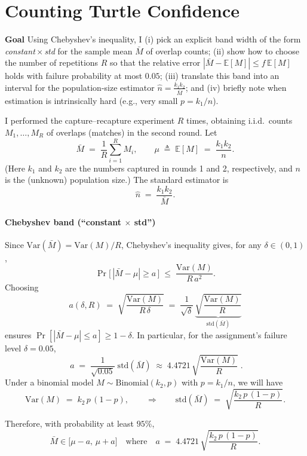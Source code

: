 \section{Counting Turtle Confidence }

\textbf{Goal} Using Chebyshev's inequality, I (i) pick an explicit band width of the form
\emph{constant\,$\times$\,std} for the sample mean $\bar M$ of overlap counts; (ii) show how to
choose the number of repetitions $R$ so that the relative error $|\bar M-\mathbb{E}[M]| \le f\,\mathbb{E}[M]$
holds with failure probability at most $0.05$; (iii) translate this band into an interval for the
population-size estimator $\hat n = \frac{k_1k_2}{\bar M}$; and (iv) briefly note when estimation is
intrinsically hard (e.g., very small $p=k_1/n$).


I performed the capture--recapture experiment $R$ times, obtaining i.i.d.\ counts $M_1,\dots, M_R$ of overlaps (matches) in the second round. Let
\[
\bar M \;=\; \frac{1}{R}\sum_{i=1}^R M_i,
\qquad
\mu \;\triangleq\; \mathbb{E}[M] \;=\; \frac{k_1 k_2}{n}.
\]
(Here $k_1$ and $k_2$ are the numbers captured in rounds 1 and 2, respectively, and $n$ is the (unknown) population size.) The standard estimator is
\[
\hat n \;=\; \frac{k_1 k_2}{\bar M}.
\]

\paragraph{Chebyshev band (``constant $\times$ std'')}
Since $\mathrm{Var}(\bar M)=\mathrm{Var}(M)/R$, Chebyshev’s inequality gives, for any $\delta\in(0,1)$,
\[
\Pr\!\big[\,|\bar M-\mu| \ge a\,\big] \;\le\; \frac{\mathrm{Var}(M)}{R\,a^2}.
\]
Choosing
\[
\boxed{\; a(\delta,R) \;=\; \sqrt{\frac{\mathrm{Var}(M)}{R\,\delta}}
\;=\; \frac{1}{\sqrt{\delta}}\,\underbrace{\sqrt{\frac{\mathrm{Var}(M)}{R}}}_{\mathrm{std}(\bar M)} \;}
\]
ensures $\Pr[|\bar M-\mu|\le a]\ge 1-\delta$. In particular, for the assignment’s failure level $\delta=0.05$,
\[
\boxed{\; a \;=\; \frac{1}{\sqrt{0.05}}\;\mathrm{std}(\bar M)
\;\approx\; 4.4721\,\sqrt{\frac{\mathrm{Var}(M)}{R}} \;}.
\]
Under a binomial model $M\sim\mathrm{Binomial}(k_2,p)$ with $p=k_1/n$, we will have
\[
\mathrm{Var}(M) \;=\; k_2\,p\,(1-p),
\qquad\Rightarrow\qquad
\mathrm{std}(\bar M) \;=\; \sqrt{\frac{k_2\,p\,(1-p)}{R}}.
\]

Therefore, with probability at least $95\%$,
\[
\bar M \in \big[\mu - a,\, \mu + a\big]
\quad\text{where}\quad
a \;=\; 4.4721\,\sqrt{\frac{k_2\,p\,(1-p)}{R}}.
\]

